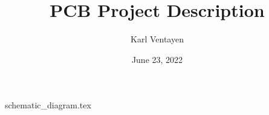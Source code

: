 \documentclass[12pt, letterpaper]{article}
\title{PCB Project Description}
\author{Karl Ventayen}
\date{June 23, 2022}
\begin{document}
\begin{comment}
\begin{titlepage}
    \maketitle
\end{titlepage}
\end{comment}

\maketitle

\tableofcontents{}
\section{}

{schematic_diagram.tex}
\end{document}
